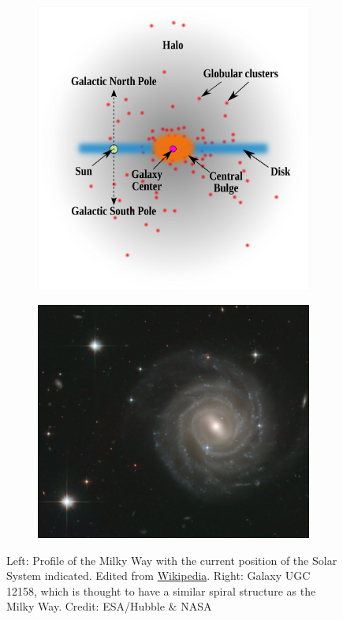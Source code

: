 \begin{figure}[bt]
    \begin{subfigure}{0.5\textwidth}
        \includegraphics[width=\textwidth]{graphics/solar_system_abundances/milky_way_profile_wiki}
    \end{subfigure}
    \begin{subfigure}{0.5\textwidth}
        \includegraphics[width=\textwidth]{graphics/solar_system_abundances/UGC_12158}
    \end{subfigure}
    \caption{Left: Profile of the Milky Way with the current position of the Solar System indicated. Edited from \href{https://en.wikipedia.org/wiki/Milky_Way}{Wikipedia}. Right: Galaxy UGC 12158, which is thought to have a similar spiral structure as the Milky Way. Credit: ESA/Hubble \& NASA}
    \label{fig:milky_way_profile_wiki}
\end{figure}
